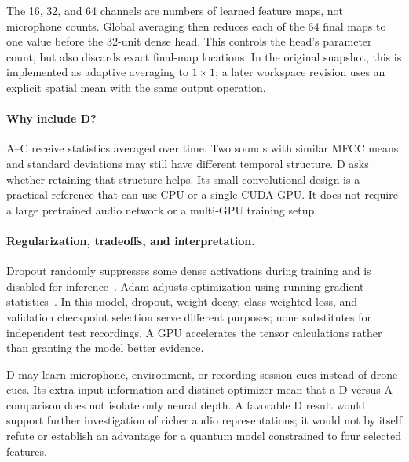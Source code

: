 \documentclass[11pt,letterpaper]{article}
\begin{document}
The 16, 32, and 64 channels are numbers of learned feature maps, not microphone
counts. Global averaging then reduces each of the 64 final maps to one value
before the 32-unit dense head. This controls the head's parameter count, but
also discards exact final-map locations. In the original snapshot, this is
implemented as adaptive averaging to $1\times1$; a later workspace revision
uses an explicit spatial mean with the same output operation.

\paragraph{Why include D?}
A--C receive statistics averaged over time. Two sounds with similar MFCC
means and standard deviations may still have different temporal structure.
D asks whether retaining that structure helps. Its small convolutional design
is a practical reference that can use CPU or a single CUDA GPU. It does not
require a large pretrained audio network or a multi-GPU training setup.

\paragraph{Regularization, tradeoffs, and interpretation.}
Dropout randomly suppresses some dense activations during training and is
disabled for inference~\cite{dropout}. Adam adjusts optimization using running
gradient statistics~\cite{adam}. In this model, dropout, weight decay,
class-weighted loss, and validation checkpoint selection serve different
purposes; none substitutes for independent test recordings. A GPU accelerates
the tensor calculations rather than granting the model better evidence.

D may learn microphone, environment, or recording-session cues instead of
drone cues. Its extra input information and distinct optimizer mean that a
D-versus-A comparison does not isolate only neural depth. A favorable D result
would support further investigation of richer audio representations; it would
not by itself refute or establish an advantage for a quantum model constrained
to four selected features.
\end{document}
